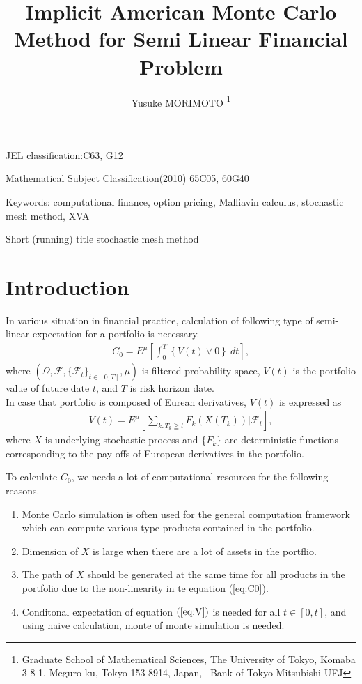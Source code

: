 \documentclass[12pt]{article}
\begin{document}
\title{Implicit American Monte Carlo Method for Semi Linear Financial Problem}
 
\author{
Yusuke MORIMOTO
\thanks{
Graduate School of Mathematical Sciences, 
The University of Tokyo, 
Komaba 3-8-1, Meguro-ku, Tokyo 153-8914, Japan, \
Bank of Tokyo Mitsubishi UFJ }
}
\date{}

\maketitle
\begin{abstract}
\end{abstract}

JEL classification:C63, G12

Mathematical Subject Classification(2010)   65C05,  60G40

Keywords:  computational finance, option pricing, Malliavin calculus, 
stochastic mesh method, XVA

Short (running) title stochastic mesh method

\section{Introduction}

In various situation in financial practice, calculation of following type of semi-linear expectation for a portfolio is necessary.
\begin{align}\label{eq:C0}
  C_0 = E^{\mu}\left[\int_{0}^T \left\{V(t) \vee0 \right \} \ dt \right],
\end{align}
where $(\Omega, \mathcal{F}, \{\mathcal{F}_t\}_{t\in [0,T]}, \mu)$ is filtered probability space, $V(t)$ is the portfolio value of future date $t$, and $T$ is risk horizon date.\\
In case that portfolio is composed of Eurean derivatives, $V(t)$ is expressed as
\begin{align}\label{eq:V}
  V(t) =  E^{\mu} \left[ \sum_{k:T_k\geqq t}F_k\left({X}(T_k)\right) |\mathcal{F}_t \right],
\end{align}
where $X$ is underlying stochastic process and $\{F_k\}$ are deterministic functions corresponding to the pay offs of European derivatives in the portfolio.

To calculate $C_0$, we needs a lot of computational resources for the following reasons.
\begin{enumerate}
  \item Monte Carlo simulation is often used for the general computation framework which can compute various type products contained in the portfolio.
  \item Dimension of $X$ is large when there are a lot of assets in the portflio.
  \item The path of $X$ should be generated at the same time for all products in the portfolio
    due to the non-linearity in te equation (\ref{eq:C0}).
  \item Conditonal expectation of equation $(\ref{eq:V})$ is needed for all $t \in [0, t]$,
    and using naive calculation, monte of monte simulation is needed.
\end{enumerate}
\end{document}
